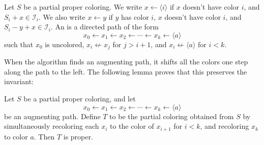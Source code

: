 \documentclass{article}
\newcommand*{\I}[0]{\mathcal{I}}
\begin{document}
\begin{definition}
  Let $S$ be a partial proper coloring.
  We write $x \gets \langle i \rangle$ if $x$ doesn't have color $i$, and $S_i + x \in \I_i$.
  We also write $x \gets y$ if $y$ has color $i$, $x$ doesn't have color $i$, and $S_i - y + x \in \I_i$.
  An  is a directed path of the form
  \[x_0 \gets x_1 \gets x_2 \gets \cdots \gets x_k \gets \langle a \rangle\]
  such that $x_0$ is uncolored, $x_i \not\gets x_j$ for $j > i + 1$, and $x_i \not\gets \langle a \rangle$ for $i < k$.
\end{definition}

When the algorithm finds an augmenting path, it shifts all the colors one step along the path to the left.
The following lemma proves that this preserves the invariant:

\begin{lemma}\label{lem:augmenting path}
  Let $S$ be a partial proper coloring,
  and let
  \[x_0 \gets x_1 \gets x_2 \gets \cdots \gets x_k \gets \langle a \rangle\]
  be an augmenting path.
  Define $T$ to be the partial coloring obtained from $S$ by simultaneously recoloring each $x_i$ to the color of $x_{i+1}$ for $i < k$, and recoloring $x_k$ to color $a$.
  Then $T$ is proper.
\end{lemma}
\end{document}
